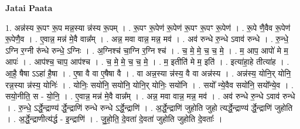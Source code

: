 \documentclass[17pt]{extarticle}
\begin{document}
\textbf{Jatai Paata} \newline

1. अन्न॑स्य रू॒पꣳ रू॒प मन्न॒स्या न्न॑स्य रू॒पम् । . रू॒पꣳ रू॒पेण॑ रू॒पेण॑ रू॒पꣳ रू॒पꣳ रू॒पेण॑ । . रू॒पे णै॒वैव रू॒पेण॑ रू॒पेणै॒व । . ए॒वान्न॒ मन्न॑ मे॒वै वान्न᳚म् । . अन्न॒ मवा वान्न॒ मन्न॒ मव॑ । . अव॑ रुन्धे रु॒न्धे ऽवाव॑ रुन्धे । . रु॒न्धे॒ ऽग्नि र॒ग्नी रु॑न्धे रुन्धे॒ ऽग्निः । . अ॒ग्निश्च॑ चा॒ग्नि र॒ग्नि श्च॑ । . च॒ मे॒ मे॒ च॒ च॒ मे॒ । . म॒ आप॒ आपो॑ मे म॒ आपः॑ । . आप॑श्च॒ चाप॒ आप॑श्च । . च॒ मे॒ मे॒ च॒ च॒ मे॒ । . म॒ इतीति॑ मे म॒ इति॑ । . इत्या॑हा॒हे तीत्या॑ह । . आ॒है॒ षैषा ऽऽहा॑ है॒षा । . ए॒षा वै वा ए॒षैषा वै । . वा अन्न॒स्या न्न॑स्य॒ वै वा अन्न॑स्य । . अन्न॑स्य॒ योनि॒र् योनि॒ रन्न॒स्या न्न॑स्य॒ योनिः॑ । . योनिः॒ सयो॑नि॒ सयो॑नि॒ योनि॒र् योनिः॒ सयो॑नि । . सयो᳚ न्ये॒वैव सयो॑नि॒ सयो᳚न्ये॒व । . सयो॒नीति॒ स - यो॒नि॒ । . ए॒वान्न॒ मन्न॑ मे॒वै वान्न᳚म् । . अन्न॒ मवा वान्न॒ मन्न॒ मव॑ । . अव॑ रुन्धे रु॒न्धे ऽवाव॑ रुन्धे । . रु॒न्धे॒ ऽर्द्धे॒न्द्राण्य॑ र्द्धे॒न्द्राणि॑ रुन्धे रुन्धे ऽर्द्धे॒न्द्राणि॑ । . अ॒र्द्धे॒न्द्राणि॑ जुहोति जुहो त्यर्द्धे॒न्द्राण्य॑ र्द्धे॒न्द्राणि॑ जुहोति । . अ॒र्द्धे॒न्द्राणीत्य॑र्द्ध - इ॒न्द्राणि॑ । . जु॒हो॒ति॒ दे॒वता॑ दे॒वता॑ जुहोति जुहोति दे॒वताः᳚ । \newline
\end{document}
